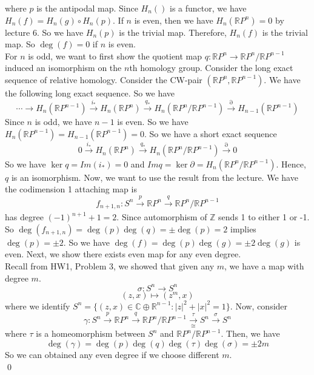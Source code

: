 \documentclass[12pt]{amsart}
\newcommand{\R}{\mathbb{R}}
\newcommand{\C}{\mathbb{C}}
\newcommand{\Z}{\mathbb{Z}}
\begin{document}
where $p$ is the antipodal map. Since $H_n()$ is a functor, we have $H_n(f)=H_n(g)\circ H_n(p)$. If $n$ is even, then we have $H_n(\R P^n)=0$ by lecture 6. So we have $H_n(p)$ is the trivial map. Therefore, $H_n(f)$ is the trivial map. So $\deg(f)=0$ if $n$ is even. \\
For $n$ is odd, we want to first show the quotient map $q:\R P^n\to \R P^n/\R P^{n-1}$ induced an isomorphism on the $n$th homology group. Consider the long exact sequence of relative homology. Consider the CW-pair $(\R P^n,\R P^{n-1})$. We have the following long exact sequence. So we have 
\[\cdots \to H_n(\R P^{n-1})\xrightarrow[]{i_\ast}H_n(\R P^n)\xrightarrow[]{q_\ast}H_n(\R P^n/\R P^{n-1})\xrightarrow[]{\partial }H_{n-1}(\R P^{n-1})\]
Since $n$ is odd, we have $n-1$ is even. So we have $H_n(\R P^{n-1})=H_{n-1}(\R P^{n-1})=0$.
So we have a short exact sequence
\[0\xrightarrow[]{i_\ast}H_n(\R P^n)\xrightarrow[]{q_\ast}H_n(\R P^n/\R P^{n-1})\xrightarrow[]{\partial }0\]
So we have $\ker q=Im(i_\ast)=0$ and $Im q=\ker \partial=H_n(\R P^n/\R P^{n-1})$. Hence, $q$ is an isomorphism. Now, we want to use the result from the lecture. We have the codimension 1 attaching map is
\[f_{n+1,n}: S^n\xrightarrow[]{p}\R P^n\xrightarrow[]{q}\R P^n/\R P^{n-1}\]
has degree $(-1)^{n+1}+1=2$. Since automorphism of $\Z$ sends 1 to  either 1 or -1. So $\deg(f_{n+1,n})=\deg(p)\deg(q)=\pm\deg(p)=2$ implies $\deg (p)=\pm2$. So we have $\deg(f)=\deg(p)\deg(g)=\pm2\deg(g)$ is even. Next, we show there exists even map for any even degree.\\
Recall from HW1, Problem 3, we showed that given any $m$, we have a map with degree $m$.
\[\sigma:S^n\to S^n\]
\[(z,x)\mapsto (z^m,x)\]
where we identify $S^n=\{(z,x)\in\C\oplus \R^{n-1}: |z|^2+|x|^2=1\}$. Now, consider
\[\gamma: S^n\xrightarrow[]{p}\R P^n\xrightarrow[]{q}\R P^n/\R P^{n-1}\xrightarrow[\cong]{\tau}S^n\xrightarrow[]{\sigma}S^n\]
where $\tau$ is a homeomorphism between $S^n$ and $\R P^n/\R P^{n-1}$.
Then, we have 
\[\deg(\gamma)=\deg(p)\deg(q)\deg(\tau)\deg(\sigma)=\pm2m\]
So we can obtained any even degree if we choose different $m$.
\\\qed\\
\end{document}
